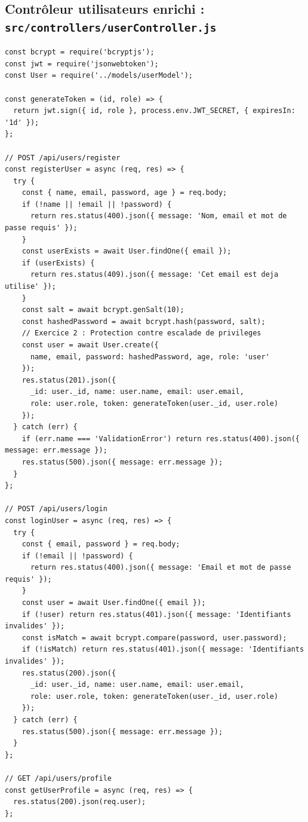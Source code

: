 \documentclass[12pt, a4paper]{article}
\begin{document}
\subsection{Contrôleur utilisateurs enrichi : \texttt{src/controllers/userController.js}}
\begin{lstlisting}
const bcrypt = require('bcryptjs');
const jwt = require('jsonwebtoken');
const User = require('../models/userModel');

const generateToken = (id, role) => {
  return jwt.sign({ id, role }, process.env.JWT_SECRET, { expiresIn: '1d' });
};

// POST /api/users/register
const registerUser = async (req, res) => {
  try {
    const { name, email, password, age } = req.body;
    if (!name || !email || !password) {
      return res.status(400).json({ message: 'Nom, email et mot de passe requis' });
    }
    const userExists = await User.findOne({ email });
    if (userExists) {
      return res.status(409).json({ message: 'Cet email est deja utilise' });
    }
    const salt = await bcrypt.genSalt(10);
    const hashedPassword = await bcrypt.hash(password, salt);
    // Exercice 2 : Protection contre escalade de privileges
    const user = await User.create({
      name, email, password: hashedPassword, age, role: 'user'
    });
    res.status(201).json({
      _id: user._id, name: user.name, email: user.email,
      role: user.role, token: generateToken(user._id, user.role)
    });
  } catch (err) {
    if (err.name === 'ValidationError') return res.status(400).json({ message: err.message });
    res.status(500).json({ message: err.message });
  }
};

// POST /api/users/login
const loginUser = async (req, res) => {
  try {
    const { email, password } = req.body;
    if (!email || !password) {
      return res.status(400).json({ message: 'Email et mot de passe requis' });
    }
    const user = await User.findOne({ email });
    if (!user) return res.status(401).json({ message: 'Identifiants invalides' });
    const isMatch = await bcrypt.compare(password, user.password);
    if (!isMatch) return res.status(401).json({ message: 'Identifiants invalides' });
    res.status(200).json({
      _id: user._id, name: user.name, email: user.email,
      role: user.role, token: generateToken(user._id, user.role)
    });
  } catch (err) {
    res.status(500).json({ message: err.message });
  }
};

// GET /api/users/profile
const getUserProfile = async (req, res) => {
  res.status(200).json(req.user);
};


\end{lstlisting}
\end{document}
